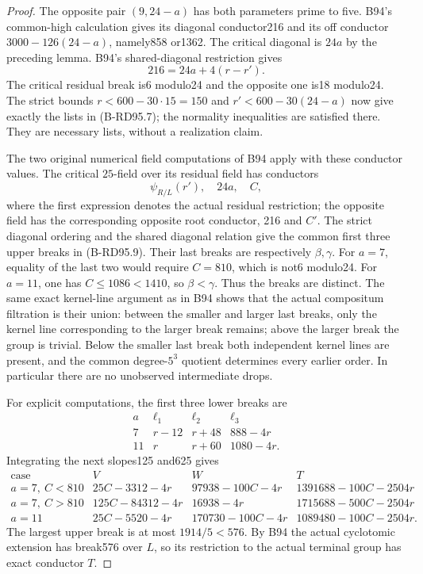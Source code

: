 \begin{proof}
The opposite pair $(9,24-a)$ has both parameters prime to five.
B94's common-high calculation gives its diagonal conductor216 and
its off conductor $3000-126(24-a)$, namely858 or1362.
The critical diagonal is $24a$ by the preceding lemma. B94's
shared-diagonal restriction gives
\[
                         216=24a+4(r-r').             \tag{B-RD95.12}
\]
The critical residual break is6 modulo24 and the opposite one
is18 modulo24. The strict bounds
$r<600-30\cdot15=150$ and $r'<600-30(24-a)$ now give exactly
the lists in (B-RD95.7); the normality inequalities are satisfied
there. They are necessary lists, without a realization claim.

The two original numerical field computations of B94 apply with
these conductor values. The critical $25$-field over its residual
field has conductors
\[
 \psi_{R/L}(r'),\quad24a,\quad C,
\]
where the first expression denotes the actual residual restriction;
the opposite field has the corresponding opposite root conductor,
216 and $C'$. The strict diagonal ordering and the shared diagonal
relation give the common first three upper breaks in (B-RD95.9).
Their last breaks are respectively $\beta,\gamma$.
For $a=7$, equality of the last two would require $C=810$, which
is not6 modulo24. For $a=11$, one has $C\le1086<1410$, so
$\beta<\gamma$. Thus the breaks are distinct. The same exact
kernel-line argument as in B94 shows that the actual compositum
filtration is their union: between the smaller and larger last
breaks, only the kernel line corresponding to the larger break
remains; above the larger break the group is trivial. Below the
smaller last break both independent kernel lines are present, and the common
degree-$5^3$ quotient determines every earlier order. In particular
there are no unobserved intermediate drops.

For explicit computations, the first three lower breaks are
\[
\begin{array}{c|ccc}
 a&\ell_1&\ell_2&\ell_3\\\hline
 7&r-12&r+48&888-4r\\
 11&r&r+60&1080-4r.
\end{array}                                           \tag{B-RD95.13}
\]
Integrating the next slopes125 and625 gives
\[
\begin{array}{c|c|c|c}
 \text{case}&V&W&T\\\hline
 a=7,\ C<810&25C-3312-4r&97938-100C-4r&1391688-100C-2504r\\
 a=7,\ C>810&125C-84312-4r&16938-4r&1715688-500C-2504r\\
 a=11&25C-5520-4r&170730-100C-4r&1089480-100C-2504r.
\end{array}                                           \tag{B-RD95.14}
\]
The largest upper break is at most $1914/5<576$. By B94 the
actual cyclotomic extension has break576 over $L$, so its
restriction to the actual terminal group has exact conductor $T$.


\end{proof}
